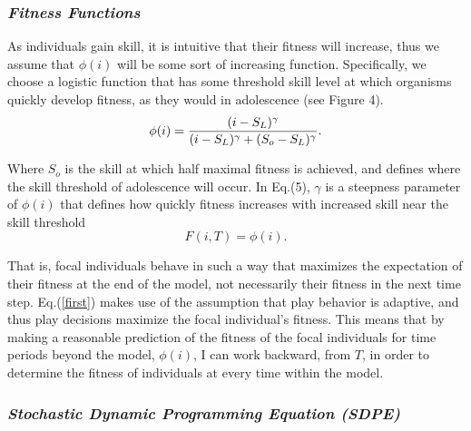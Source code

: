 \documentclass[12pt, letterpaper, fleqn]{article}
\begin{document}
    \subsubsection*{\it Fitness Functions}
      As individuals gain skill, it is intuitive that their fitness will increase, thus we assume that $\phi(i)$ will be some sort of increasing function.     
      Specifically, we choose a logistic function that has some threshold skill level at which organisms quickly develop fitness, as they would in adolescence (see Figure 4).   
      \begin{equation}
      \phi(i) = {(i-S_L)^\gamma \over {(i-S_L)^\gamma+(S_o-S_L)^\gamma} }.
      \label{phi}
      \end{equation}
      
      Where $S_o$ is the skill at which half maximal fitness is achieved, and defines where the skill threshold of adolescence will occur.   
      In Eq.(5), $\gamma$ is a steepness parameter of $\phi(i)$ that defines how quickly fitness increases with increased skill near the skill threshold
      \begin{equation}
      F(i,T) = \phi(i).
      \label{equivalence}
      \end{equation}
      
      That is, focal individuals behave in such a way that maximizes the expectation of their fitness at the end of the model, not necessarily their fitness in the next time step.
      Eq.(\ref{first}) makes use of the assumption that play behavior is adaptive, and thus play decisions maximize the focal individual's fitness.
      This means that by making a reasonable prediction of the fitness of the focal individuals for time periods beyond the model, $\phi(i)$, I can work backward, from $T$, in order to determine the fitness of individuals at every time within the model.   
      
    \subsubsection*{\it Stochastic Dynamic Programming Equation (SDPE)}
      
\end{document}
